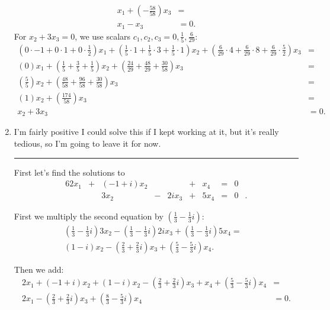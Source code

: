 \documentclass[12pt]{article}
\begin{document}
\begin{enumerate}
\begin{align*}
        x_1 + (-\frac{58}{58})x_3 &=\\
        x_1 - x_3 &= 0.
      \end{align*}
      For $x_2 + 3x_3 = 0$, we use scalars $c_1, c_2, c_3
      = 0, \frac{1}{5}, \frac{6}{29}$:
      \begin{align*}
        (0\cdot-1 + 0\cdot1 + 0\cdot\frac{1}{2})x_1 +
        (\frac{1}{5}\cdot1 + \frac{1}{5}\cdot3 + \frac{1}{5}\cdot1)x_2 +
        (\frac{6}{29}\cdot4 + \frac{6}{29}\cdot8 + \frac{6}{29}\cdot\frac{5}{2})x_3 &=\\
        (0)x_1 + (\frac{1}{5} + \frac{3}{5} + \frac{1}{5})x_2 +
        (\frac{24}{29} + \frac{48}{29} + \frac{30}{58})x_3 &=\\
        (\frac{5}{5})x_2 + (\frac{48}{58} + \frac{96}{58} + \frac{30}{58})x_3 &=\\
        (1)x_2 + (\frac{174}{58})x_3 &=\\
        x_2 + 3x_3 &= 0.
      \end{align*}

    \item
      I'm fairly positive I could solve this if I kept working at
      it, but it's really tedious, so I'm going to leave it for
      now.

      \noindent\rule{\textwidth}{1pt}

      First let's find the solutions to
      \begin{alignat*}{6}
        2x_1 & {}+{} & (-1 + i)x_2 & {} {} &       & {}+{} &  x_4 & {}={} & 0 &\\
             & {} {} &        3x_2 & {}-{} & 2ix_3 & {}+{} & 5x_4 & {}={} & 0 &.
      \end{alignat*}

      First we multiply the second equation by $(\frac{1}{3} -
      \frac{1}{3}i)$:
      \begin{align*}
        (\frac{1}{3} - \frac{1}{3}i)3x_2
          - (\frac{1}{3} - \frac{1}{3}i)2ix_3
          + (\frac{1}{3} - \frac{1}{3}i)5x_4 =&\\
        (1 - i)x_2
          - (\frac{2}{3} + \frac{2}{3}i)x_3
          + (\frac{5}{3} - \frac{5}{3}i)x_4.
      \end{align*}

      Then we add:
      \begin{align*}
        2x_1
          + (-1 + i)x_2 + (1 - i)x_2
          - (\frac{2}{3} + \frac{2}{3}i)x_3
          + x_4 + (\frac{5}{3} - \frac{5}{3}i)x_4 &= \\
        2x_1
          - (\frac{2}{3} + \frac{2}{3}i)x_3
          + (\frac{8}{3} - \frac{5}{3}i)x_4 &= 0.
      \end{align*}


\end{enumerate}
\end{document}
